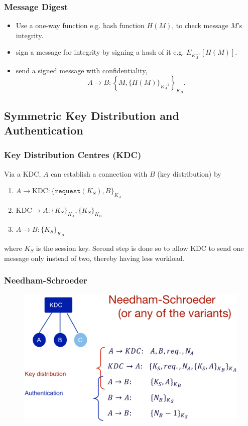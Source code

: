 \documentclass[twocolumn,landscape,10pt]{article}
\theoremstyle{definition}
\begin{document}
\subsubsection{Message Digest}

\begin{itemize}
    \item Use a one-way function e.g. hash function $H(M)$, to check message
        $M$'s integrity.
    \item sign a message for integrity by signing a hash of it e.g.
        $E_{K_A^{-1}}[H(M)]$.
    \item send a signed message with confidentiality, 
        \[
            A\rightarrow B: \left\{M,{\{H(M)\}}_{K_A^{-1}}\right\}_{K_B}.
        \]
\end{itemize} 


\subsection{Symmetric Key Distribution and Authentication}

\subsubsection{Key Distribution Centres (KDC)}

Via a KDC, $A$ can establish a connection with $B$ (key distribution) by
\begin{enumerate}
    \item $A\rightarrow\text{KDC}:{\{\texttt{request}(K_S),B\}}_{K_A}$
    \item $\text{KDC}\rightarrow A:{\{K_S\}}_{K_A},{\{K_S\}}_{K_B}$
    \item $A\rightarrow B:{\{K_S\}}_{K_B}$
\end{enumerate} 
where $K_S$ is the session key.
Second step is done so to allow KDC to send one message only instead of two,
thereby having less workload.

\subsubsection{Needham-Schroeder}

\begin{figure}[h]
  	\includegraphics[scale=0.30]{needham.png}
  	\centering
\end{figure}
\end{document}
